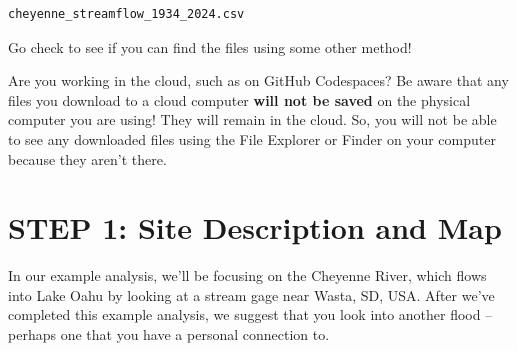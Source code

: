 \documentclass[
  letterpaper,
  DIV=11,
  numbers=noendperiod,
  oneside]{scrreprt}
\newenvironment{Shaded}{\begin{snugshade}}{\end{snugshade}}
\newcommand{\NormalTok}[1]{\textcolor[rgb]{0.00,0.23,0.31}{#1}}
\newcommand{\OperatorTok}[1]{\textcolor[rgb]{0.37,0.37,0.37}{#1}}
\newcommand{\StringTok}[1]{\textcolor[rgb]{0.13,0.47,0.30}{#1}}
\begin{document}
\begin{Shaded}
\end{Shaded}

\begin{verbatim}
cheyenne_streamflow_1934_2024.csv
\end{verbatim}

\begin{tcolorbox}[enhanced jigsaw, colbacktitle=quarto-callout-color!10!white, opacityback=0, bottomtitle=1mm, toptitle=1mm, bottomrule=.15mm, left=2mm, colframe=quarto-callout-color-frame, leftrule=.75mm, opacitybacktitle=0.6, colback=white, rightrule=.15mm, toprule=.15mm, breakable, titlerule=0mm, title=\textcolor{quarto-callout-color}{\faInfo}\hspace{0.5em}{Try It}, coltitle=black, arc=.35mm]

Go check to see if you can find the files using some other method!

\end{tcolorbox}

\begin{tcolorbox}[enhanced jigsaw, colbacktitle=quarto-callout-warning-color!10!white, opacityback=0, bottomtitle=1mm, toptitle=1mm, bottomrule=.15mm, left=2mm, colframe=quarto-callout-warning-color-frame, leftrule=.75mm, opacitybacktitle=0.6, colback=white, rightrule=.15mm, toprule=.15mm, breakable, titlerule=0mm, title=\textcolor{quarto-callout-warning-color}{\faExclamationTriangle}\hspace{0.5em}{Warning}, coltitle=black, arc=.35mm]

Are you working in the cloud, such as on GitHub Codespaces? Be aware
that any files you download to a cloud computer \textbf{will not be
saved} on the physical computer you are using! They will remain in the
cloud. So, you will not be able to see any downloaded files using the
File Explorer or Finder on your computer because they aren't there.

\end{tcolorbox}

\section{STEP 1: Site Description and
Map}\label{step-1-site-description-and-map}

In our example analysis, we'll be focusing on the Cheyenne River, which
flows into Lake Oahu by looking at a stream gage near Wasta, SD, USA.
After we've completed this example analysis, we suggest that you look
into another flood -- perhaps one that you have a personal connection
to.
\end{document}
